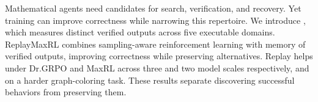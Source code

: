 Mathematical agents need candidates for search, verification, and recovery.
Yet training can improve correctness while narrowing this repertoire. We
introduce \mb{}, which measures distinct verified outputs across five executable
domains. ReplayMaxRL combines sampling-aware reinforcement learning with memory
of verified outputs, improving correctness while preserving alternatives.
Replay helps under Dr.GRPO and MaxRL across three and two model scales
respectively, and on a harder graph-coloring task. These results separate
discovering successful behaviors from preserving them.
